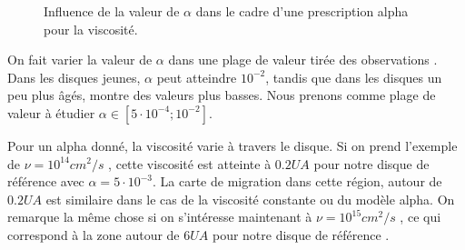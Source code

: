 \begin{figure}[htb]
\centering
{}
\hfill
{}

\hfill
{}
\caption{Influence de la valeur de $\alpha$ dans le cadre d'une prescription alpha pour la viscosité. }
\end{figure}\label{fig:alpha_viscosity}

On fait varier la valeur de $\alpha$ dans une plage de valeur tirée des observations \citep{guilloteau2011dual}. Dans les disques jeunes, $\alpha$ peut atteindre $10^{-2}$, tandis que dans les disques un peu plus âgés, \cite[fig. 16]{guilloteau2011dual} montre des valeurs plus basses. Nous prenons comme plage de valeur à étudier $\alpha\in[5\cdot 10^{-4} ; 10^{-2}]$. 

Pour un alpha donné, la viscosité varie à travers le disque. Si on prend l'exemple de $\nu=10^{14}\unit{cm^2/s}$ , cette viscosité est atteinte à $0.2\unit{UA}$ pour notre disque de référence avec $\alpha=5\cdot 10^{-3}$. La carte de migration dans cette région, autour de $0.2\unit{UA}$ est similaire dans le cas de la viscosité constante ou du modèle alpha. On remarque la même chose si on s'intéresse maintenant à $\nu=10^{15}\unit{cm^2/s}$ , ce qui correspond à la zone autour de $6\unit{UA}$ pour notre disque de référence .

